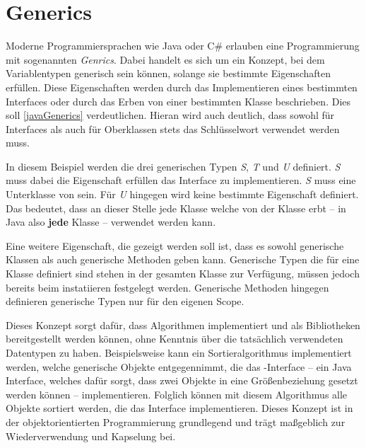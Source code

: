 \section{Generics}
Moderne Programmiersprachen wie Java oder C\# erlauben eine Programmierung mit sogenannten \textit{Genrics}. Dabei handelt es sich um ein Konzept, bei dem Variablentypen generisch sein können, solange sie bestimmte Eigenschaften erfüllen. Diese Eigenschaften werden durch das Implementieren eines bestimmten Interfaces oder durch das Erben von einer bestimmten Klasse beschrieben. Dies soll \autoref{javaGenerics} verdeutlichen. Hieran wird auch deutlich, dass sowohl für Interfaces als auch für Oberklassen stets das Schlüsselwort  verwendet werden muss.


In diesem Beispiel werden die drei generischen Typen \textit{S}, \textit{T} und \textit{U} definiert. \textit{S} muss dabei die Eigenschaft erfüllen das  Interface zu implementieren. \textit{S} muss eine Unterklasse von  sein. Für \textit{U} hingegen wird keine bestimmte Eigenschaft definiert. Das bedeutet, dass an dieser Stelle jede Klasse welche von der Klasse  erbt -- in Java also \textbf{jede} Klasse -- verwendet werden kann. 

Eine weitere Eigenschaft, die gezeigt werden soll ist, dass es sowohl generische Klassen als auch generische Methoden geben kann. Generische Typen die für eine Klasse definiert sind stehen in der gesamten Klasse zur Verfügung, müssen jedoch bereits beim instatiieren festgelegt werden. Generische Methoden hingegen definieren generische Typen nur für den eigenen Scope.

Dieses Konzept sorgt dafür, dass Algorithmen implementiert und als Bibliotheken bereitgestellt werden können, ohne Kenntnis über die tatsächlich verwendeten Datentypen zu haben. Beispielsweise kann ein Sortieralgorithmus implementiert werden, welche generische Objekte entgegennimmt, die das -Interface -- ein Java Interface, welches dafür sorgt, dass zwei Objekte in eine Größenbeziehung gesetzt werden können -- implementieren. Folglich können mit diesem Algorithmus alle Objekte sortiert werden, die das Interface implementieren. Dieses Konzept ist in der objektorientierten Programmierung grundlegend und trägt maßgeblich zur Wiederverwendung und Kapselung bei.